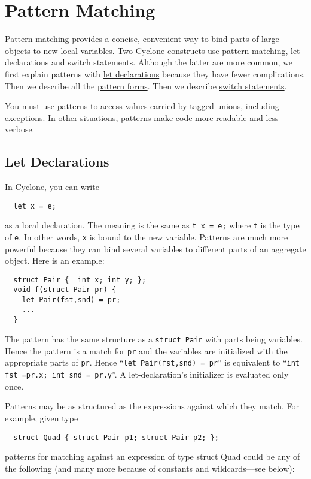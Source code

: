 \section{Pattern Matching}
\label{sec:patterns}

Pattern matching provides a concise, convenient way to bind parts of
large objects to new local variables.  Two Cyclone constructs use
pattern matching, let declarations and switch statements.  Although
the latter are more common, we first explain patterns with
\hyperlink{let_decls}{let declarations} because they have fewer
complications.  Then we describe all the \hyperlink{pat_forms}{pattern
  forms}.  Then we describe \hyperlink{switch_stmt}{switch
  statements}.

You must use patterns to access values carried by
\hyperref[{sec:taggedunions}]{tagged unions}, including exceptions.  In
other situations, patterns make code more readable and less verbose.

\subsection{Let Declarations}\hypertarget{let_decls}{}

In Cyclone, you can write
\begin{verbatim}
  let x = e;
\end{verbatim}
as a local declaration.  The meaning is the same as \texttt{t x = e;}
where \texttt{t} is the type of \texttt{e}.  In other words,
\texttt{x} is bound to the new variable.  Patterns are much more
powerful because they can bind several variables to different parts of
an aggregate object.  Here is an example:
\begin{verbatim}
  struct Pair {  int x; int y; };
  void f(struct Pair pr) {
    let Pair(fst,snd) = pr;
    ...
  }
\end{verbatim}

The pattern has the same structure as a \texttt{struct Pair} with parts
being variables.  Hence the pattern is a match for \texttt{pr} and the
variables are initialized with the appropriate parts of \texttt{pr}.  Hence
``\texttt{let Pair(fst,snd) = pr}'' is equivalent to
``\texttt{int fst =pr.x; int snd = pr.y}''.  A let-declaration's
initializer is evaluated only once.

Patterns may be as structured as the expressions against which they
match.  For example, given type
\begin{verbatim}
  struct Quad { struct Pair p1; struct Pair p2; };
\end{verbatim}
patterns for matching against an expression of type struct Quad could
be any of the following (and many more because of constants and
wildcards---see below):

